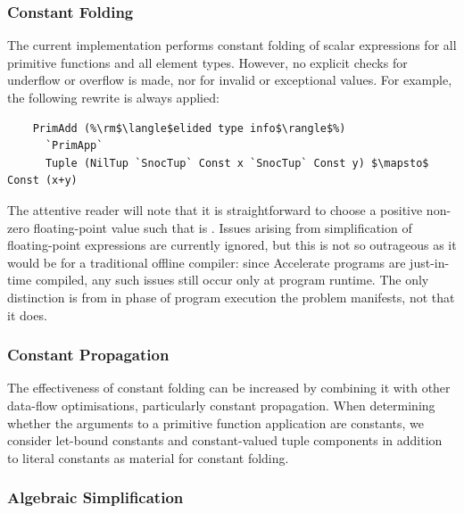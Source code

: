 \subsubsection{Constant Folding}

The current implementation performs constant folding of scalar expressions for
all primitive functions and all element types. However, no explicit checks for
underflow or overflow is made, nor for invalid or exceptional values. For
example, the following rewrite is always applied:
%
%
\begin{lstlisting}[style=Haskell,numbers=none,mathescape]
%\bf$\langle$ constant folding $\rangle$%
    PrimAdd (%\rm$\langle$elided type info$\rangle$%)
      `PrimApp`
      Tuple (NilTup `SnocTup` Const x `SnocTup` Const y) $\mapsto$ Const (x+y)
\end{lstlisting}
%
The attentive reader will note that it is straightforward to choose a positive
non-zero floating-point value  such that  is
. Issues arising from simplification of floating-point expressions
are currently ignored, but this is not so outrageous as it would be for a
traditional offline compiler: since Accelerate programs are just-in-time
compiled, any such issues still occur only at program runtime. The only
distinction is from in phase of program execution the problem manifests, not
that it does.



\subsubsection{Constant Propagation}

The effectiveness of constant folding can be increased by combining it with
other data-flow optimisations, particularly constant propagation. When
determining whether the arguments to a primitive function application are
constants, we consider let-bound constants and constant-valued tuple components
in addition to literal constants as material for constant folding.


\subsubsection{Algebraic Simplification}

